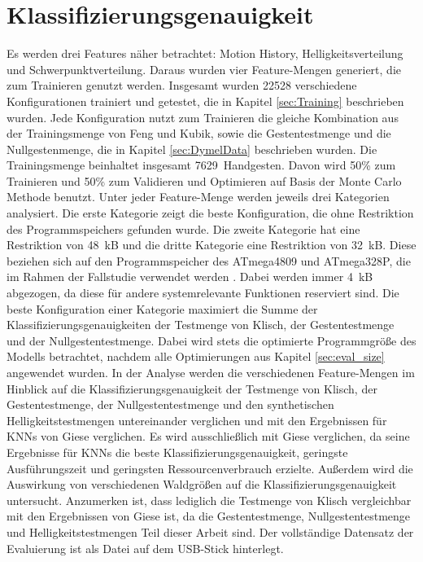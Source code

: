 \section{Klassifizierungsgenauigkeit}
Es werden drei Features näher betrachtet: Motion History, Helligkeitsverteilung und Schwerpunktverteilung. Daraus wurden vier Feature-Mengen generiert, die zum Trainieren genutzt werden. Insgesamt wurden 22528
verschiedene Konfigurationen trainiert und getestet, die in Kapitel \ref{sec:Training} beschrieben wurden. Jede Konfiguration nutzt zum Trainieren die gleiche Kombination aus der Trainingsmenge von Feng und Kubik,
sowie die Gestentestmenge und die Nullgestenmenge, die in Kapitel \ref{sec:DymelData} beschrieben wurden. Die Trainingsmenge beinhaltet insgesamt 7629~Handgesten. Davon wird 50\% zum Trainieren und 50\% zum
Validieren und Optimieren auf Basis der Monte Carlo Methode benutzt.
\newline
\newline
Unter jeder Feature-Menge werden jeweils drei Kategorien analysiert. Die erste Kategorie zeigt die beste Konfiguration, die ohne Restriktion des Programmspeichers gefunden wurde. Die zweite Kategorie hat eine Restriktion
von 48~kB und die dritte Kategorie eine Restriktion von 32~kB. Diese beziehen sich auf den Programmspeicher des ATmega4809 und ATmega328P, die im Rahmen der Fallstudie verwendet werden \cite{venzkeArticle}.
Dabei werden immer 4~kB abgezogen, da diese für andere systemrelevante Funktionen reserviert sind. Die beste Konfiguration einer Kategorie maximiert die Summe
der Klassifizierungsgenauigkeiten der Testmenge von Klisch, der Gestentestmenge und der Nullgestentestmenge. Dabei wird stets die optimierte Programmgröße des Modells betrachtet,
nachdem alle Optimierungen aus Kapitel \ref{sec:eval_size} angewendet wurden.
\newline
\newline
In der Analyse werden die verschiedenen Feature-Mengen im Hinblick auf die Klassifizierungsgenauigkeit der Testmenge von Klisch, der Gestentestmenge, der Nullgestentestmenge und den synthetischen
Helligkeitstestmengen untereinander verglichen und mit den Ergebnissen für KNNs von Giese verglichen. Es wird ausschließlich mit Giese verglichen, da seine Ergebnisse für KNNs die beste Klassifizierungsgenauigkeit,
geringste Ausführungszeit und geringsten Ressourcenverbrauch erzielte. Außerdem wird die Auswirkung von verschiedenen Waldgrößen auf die Klassifizierungsgenauigkeit untersucht. Anzumerken ist, dass
lediglich die Testmenge von Klisch vergleichbar mit den Ergebnissen von Giese ist, da die Gestentestmenge, Nullgestentestmenge und Helligkeitstestmengen Teil dieser Arbeit sind.
Der vollständige Datensatz der Evaluierung ist als Datei auf dem USB-Stick hinterlegt.







